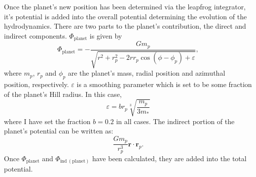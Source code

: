 Once the planet's new position has been determined via the leapfrog integrator, it's potential is added into the overall potential determining the evolution of the hydrodynamics. There are two parts to the planet's contribution, the direct and indirect components. $\Phi_{\mathrm{planet}}$ is given by 
\begin{equation}
\Phi_{\mathrm{planet}} = - \frac{G m_p}{\sqrt{r^2 + r_p^2 - 2rr_p \cos (\phi - \phi_p) + \varepsilon}},
\label{eq:planetphi}
\end{equation}
where $m_p$, $r_p$ and $\phi_p$ are the planet's mass, radial position and azimuthal position, respectively. $\varepsilon$ is a smoothing parameter which is set to be some fraction of the planet's Hill radius. In this case, 
\begin{equation}
\varepsilon = b r_p \sqrt[3]{\frac{m_p}{3m_\ast}}
\end{equation} 
where I have set the fraction $b = 0.2$ in all cases. The indirect portion of the planet's potential can be written as:
\begin{equation}
\frac{Gm_p}{r_p^3}\boldsymbol{r} \cdot \boldsymbol{r}_p.
\end{equation}
Once $\Phi_{\mathrm{planet}}$ and $\Phi_{\mathrm{ind~(planet)}}$ have been calculated, they are added into the total potential.

